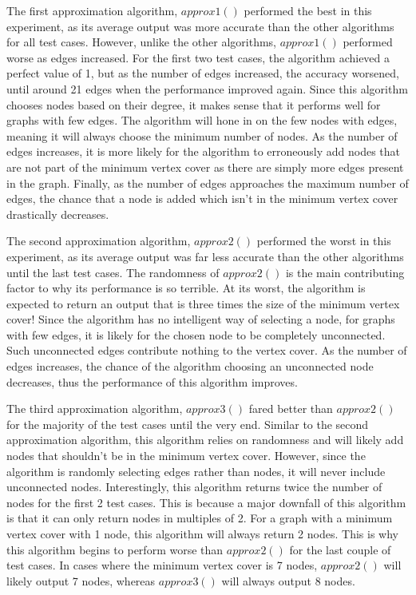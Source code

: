 \documentclass[titlepage]{article}
\begin{document}
The first approximation algorithm, $approx1()$ performed the best in this experiment, as its average output was more accurate than the other algorithms for all test cases. However, unlike the other algorithms, $approx1()$ performed worse as edges increased. For the first two test cases, the algorithm achieved a perfect value of 1, but as the number of edges increased, the accuracy worsened, until around 21 edges when the performance improved again. Since this algorithm chooses nodes based on their degree, it makes sense that it performs well for graphs with few edges. The algorithm will hone in on the few nodes with edges, meaning it will always choose the minimum number of nodes. As the number of edges increases, it is more likely for the algorithm to erroneously add nodes that are not part of the minimum vertex cover as there are simply more edges present in the graph. Finally, as the number of edges approaches the maximum number of edges, the chance that a node is added which isn't in the minimum vertex cover drastically decreases. 

The second approximation algorithm, $approx2()$ performed the worst in this experiment, as its average output was far less accurate than the other algorithms until the last test cases.
The randomness of $approx2()$ is the main contributing factor to why its performance is so terrible. At its worst, the algorithm is expected to return an output that is three times the size of the minimum vertex cover! Since the algorithm has no intelligent way of selecting a node, for graphs with few edges, it is likely for the chosen node to be completely unconnected. Such unconnected edges contribute nothing to the vertex cover. As the number of edges increases, the chance of the algorithm choosing an unconnected node decreases, thus the performance of this algorithm improves.

The third approximation algorithm, $approx3()$ fared better than $approx2()$ for the majority of the test cases until the very end. Similar to the second approximation algorithm, this algorithm relies on randomness and will likely add nodes that shouldn't be in the minimum vertex cover. However, since the algorithm is randomly selecting edges rather than nodes, it will never include unconnected nodes. Interestingly, this algorithm returns twice the number of nodes for the first 2 test cases. This is because a major downfall of this algorithm is that it can only return nodes in multiples of 2. For a graph with a minimum vertex cover with 1 node, this algorithm will always return 2 nodes. This is why this algorithm begins to perform worse than $approx2()$ for the last couple of test cases. In cases where the minimum vertex cover is 7 nodes, $approx2()$ will likely output 7 nodes, whereas $approx3()$ will always output 8 nodes.
\end{document}
